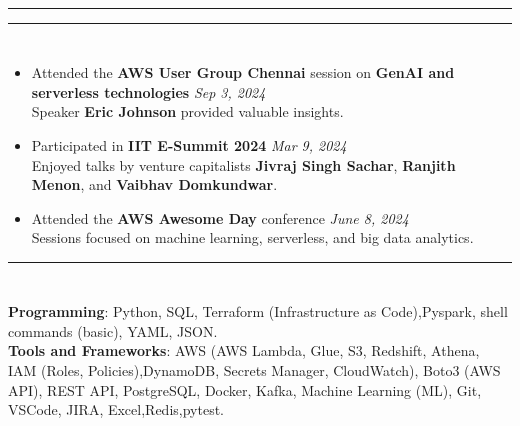 \documentclass[a4paper,10pt]{article}
\begin{document}
\hrule
\hrule
\section{\scshape\color{Fuchsia}{\faUsers \ \textbf SEMINARS \& CONFERENCES}}
\begin{itemize}
    \item Attended the \textbf{AWS User Group Chennai} session on \textbf{GenAI and serverless technologies} \href{https://www.linkedin.com/posts/a-shreehari_awsusergroupchennai-aws-serverless-activity-7238775038324129792-rlYK?utm_source=share&utm_medium=member_desktop}{} \hfill \textit{Sep 3, 2024} \\ 
    Speaker \textbf{Eric Johnson} provided valuable insights.
    \vspace{-2mm}
    \item Participated in \textbf{IIT E-Summit 2024} \href{https://www.linkedin.com/posts/jayasri-anbazhagan-514684265_iitm-e-activity-7174416598450020352-jMtA?utm_source=share&utm_medium=member_desktop}{} \hfill \textit{Mar 9, 2024} \\ 
    Enjoyed talks by venture capitalists \textbf{Jivraj Singh Sachar}, \textbf{Ranjith Menon}, and \textbf{Vaibhav Domkundwar}.
    \vspace{-2mm}
    \item Attended the \textbf{AWS Awesome Day} conference \href{https://www.linkedin.com/posts/activity-7077135676516798464-hqoG?utm_source=share&utm_medium=member_desktop}{} \hfill \textit{June 8, 2024} \\ 
    Sessions focused on machine learning, serverless, and big data analytics.
\end{itemize}

\hrule
\section{\scshape\color{Fuchsia}{\faTools\ \textbf TECHNICAL SKILLS}}
\textbf{Programming}: Python, SQL, Terraform (Infrastructure as Code),Pyspark, shell commands (basic), YAML, JSON. \\
\textbf{Tools and Frameworks}: AWS (AWS Lambda, Glue, S3, Redshift, Athena, IAM (Roles, Policies),DynamoDB, Secrets Manager, CloudWatch), Boto3 (AWS API), REST API, PostgreSQL, Docker, Kafka, Machine Learning (ML), Git, VSCode, JIRA, Excel,Redis,pytest.
\vspace{3mm}
\end{document}
